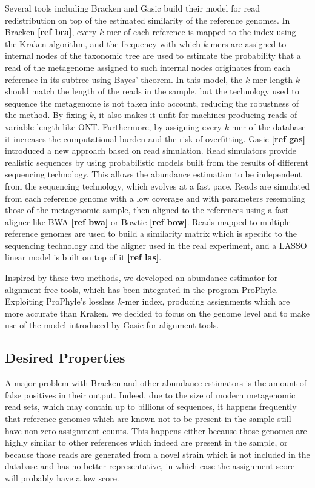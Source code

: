 Several tools including Bracken and Gasic build their model for read redistribution on top of the estimated similarity of the reference genomes. In Bracken \textbf{[ref bra]}, every $k$-mer of each reference is mapped to the index using the Kraken algorithm, and the frequency with which $k$-mers are assigned to internal nodes of the taxonomic tree are used to estimate the probability that a read of the metagenome assigned to such internal nodes originates from each reference in its subtree using Bayes' theorem. In this model, the $k$-mer length $k$ should match the length of the reads in the sample, but the technology used to sequence the metagenome is not taken into account, reducing the robustness of the method. By fixing $k$, it also makes it unfit for machines producing reads of variable length like ONT. Furthermore, by assigning every $k$-mer of the database it increases the computational burden and the risk of overfitting.
Gasic \textbf{[ref gas]} introduced a new approach based on read simulation. Read simulators provide realistic sequences by using probabilistic models built from the results of different sequencing technology. This allows the abundance estimation to be independent from the sequencing technology, which evolves at a fast pace. Reads are simulated from each reference genome with a low coverage and with parameters resembling those of the metagenomic sample, then aligned to the references using a fast aligner like BWA \textbf{[ref bwa]} or Bowtie \textbf{[ref bow]}. Reads mapped to multiple reference genomes are used to build a similarity matrix which is specific to the sequencing technology and the aligner used in the real experiment, and a LASSO linear model is built on top of it \textbf{[ref las]}.

Inspired by these two methods, we developed an abundance estimator for alignment-free tools, which has been integrated in the program ProPhyle. Exploiting ProPhyle's lossless $k$-mer index, producing assignments which are more accurate than Kraken, we decided to focus on the genome level and to make use of the model introduced by Gasic for alignment tools.

\subsection{Desired Properties}

A major problem with Bracken and other abundance estimators is the amount of false positives in their output. Indeed, due to the size of modern metagenomic read sets, which may contain up to billions of sequences, it happens frequently that reference genomes which are known not to be present in the sample still have non-zero assignment counts. This happens either because those genomes are highly similar to other references which indeed are present in the sample, or because those reads are generated from a novel strain which is not included in the database and has no better representative, in which case the assignment score will probably have a low score.

